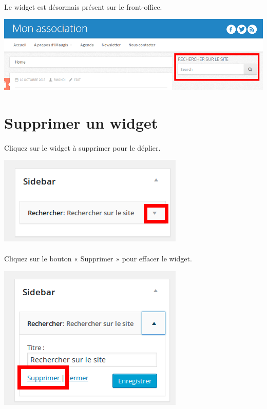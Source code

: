 \documentclass[10pt,a4paper]{article}
\begin{document}
\paragraph{}Le widget est désormais présent sur le front-office.
\begin{center}
\includegraphics[scale=0.3]{img/0256.png}
\end{center}
\newpage
\section{Supprimer un widget}
\paragraph{}Cliquez sur le widget à supprimer pour le déplier.
\begin{center}
\includegraphics[scale=0.3]{img/0257.png}
\end{center}
\paragraph{}Cliquez sur le bouton « Supprimer » pour effacer le widget.
\begin{center}
\includegraphics[scale=0.3]{img/0258.png}
\end{center}
\end{document}
